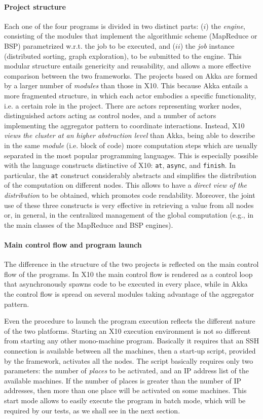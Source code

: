 \documentclass[a4paper]{article}
\numberwithin{equation}{section}
\begin{document}
\paragraph{Project structure}
Each one of the four programs is divided in two distinct parts:
($i$) the \emph{engine}, consisting of the modules that implement the
algorithmic scheme (MapReduce or BSP) parametrized
w.r.t. the job to be executed, 
and ($ii$) the \emph{job} instance (distributed sorting, graph
exploration), to be submitted to the engine.
This modular structure entails genericity and reusability, and allows
a more effective comparison between the two frameworks.
The projects based on Akka are formed by a larger
  number of \emph{modules} than those in X10. 
This because Akka entails a more fragmented 
structure, in which each actor embodies a specific functionality,
i.e. a certain role in the project. There are actors
representing worker nodes, distinguished actors acting as control
nodes, 
and a number of actors implementing the aggregator pattern to
coordinate interactions.
Instead, 
X10 \emph{views the cluster at an higher abstraction level} than
Akka, being able to describe in the same \emph{module} (i.e. block of
code) more computation steps which are usually separated in the most
popular programming languages. This is especially possible with
the language constructs distinctive of X10: \verb+at+,
\verb+async+, and \verb+finish+. 
In particular, the \verb+at+ construct considerably abstracts and simplifies the distribution of the computation on different nodes.
This allows to have a \textit{direct view of the distribution} 
to be obtained, which promotes code readability. 
Moreover, the joint use of these three constructs is very effective in
retrieving a value from all nodes or, in general, in the centralized
management of the global computation
(e.g., in the main classes of the MapReduce and BSP engines).

\paragraph{Main control flow and program launch}
The difference in the structure of the two projects is reflected on
the main control flow of the programs. In X10 the main control flow is
rendered as a control loop that asynchronously spawns code to be
executed in every place, while in Akka the control flow is spread on
several modules taking advantage of the aggregator pattern.

Even the procedure to launch the program execution reflects the
different nature of the two platforms. Starting an X10 execution
environment is not so different from starting any other mono-machine
program. Basically it requires that an SSH connection is available
between all the machines, then a start-up script, provided by the
framework, activates all the nodes. The script basically requires only
two parameters: the number of \emph{places} to be activated, and an
IP address list of the available machines. 
If the number of places is greater than the number of IP addresses,
then more than one place will be activated on some machines. 
This start mode allows to easily execute the program in batch mode,
which will be required by our tests, as we shall see in the next
section.
\end{document}
